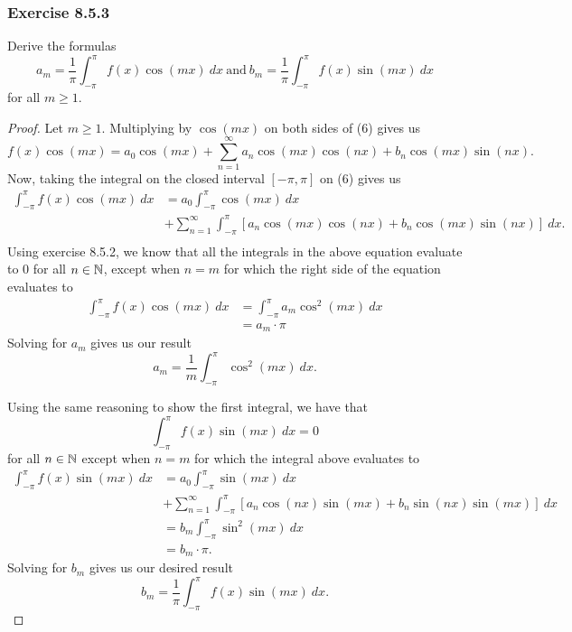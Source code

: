 \subsubsection{Exercise 8.5.3} Derive the formulas
\[  a_{m} = \frac{ 1 }{ \pi  } \int_{ -\pi  }^{ \pi  } f(x) \cos(mx) \ dx \ \text{and} \ b_{m} = \frac{ 1 }{ \pi  } \int_{ -\pi  }^{ \pi  } f(x) \sin(mx) \ dx \] for all \( m \geq 1 \).
\begin{proof}
Let \( m \geq 1  \). Multiplying by \( \cos(mx) \) on both sides of (6) gives us 
\[  f(x) \cos(mx) = a_{0} \cos(mx) + \sum_{ n=1 }^{ \infty } a_{n}\cos(mx)\cos(nx) + b_{n} \cos(mx) \sin(nx).  \]
Now, taking the integral on the closed interval \( [- \pi , \pi ] \) on (6) gives us 
\begin{align*}
    \int_{ - \pi  }^{ \pi  } f(x) \cos(mx)  \ dx &= a_{0} \int_{ -\pi  }^{ \pi  } \cos(mx)  \ dx \\ 
                                                 &+ \sum_{ n=1   }^{ \infty  } \int_{ - \pi  }^{ \pi  } [ a_{n} \cos(mx) \cos(nx) + b_{n} \cos(mx) \sin(nx)   ] \ dx. \\
\end{align*}
Using exercise 8.5.2, we know that all the integrals in the above equation evaluate to 0 for all \( n \in \mathbb{N}  \), except when \( n =m  \) for which the right side of the equation evaluates to
\begin{align*}
   \int_{ - \pi  }^{ \pi  } f(x) \cos(mx)  \ dx &= \int_{ -\pi  }^{ \pi } a_{m} \cos ^{2}(mx) \ dx \\
                                                &= a_{m} \cdot \pi
\end{align*}
Solving for \( a_{m}  \) gives us our result
\[  a_{m} = \frac{ 1 }{ m } \int_{ -\pi  }^{ \pi  } \cos ^{2}(mx) \ dx. \]

Using the same reasoning to show the first integral, we have that 
\[  \int_{ -\pi  }^{ \pi  } f(x) \sin(mx)  \ dx = 0  \]
for all \( n \in \mathbb{N}  \) except when \( n = m  \) for which the integral above evaluates to
\begin{align*}
    \int_{ -\pi  }^{ \pi  } f(x) \sin(mx)  \ dx &=  a_{0} \int_{ - \pi  }^{ \pi  } \sin(mx) \ dx \\ 
                                                &+ \sum_{ n=1 }^{ \infty  } \int_{ -\pi  }^{ \pi }   [ a_{n} \cos(nx) \sin(mx) + b_{n} \sin(nx) \sin(mx)   ] \ dx \\
                                                &= b_{m} \int_{ -\pi  }^{ \pi  } \sin^{2}(mx) \ dx \\
                                                &= b_{m} \cdot \pi.
\end{align*}
Solving for \( b_{m} \) gives us our desired result
\[  b_{m} = \frac{ 1 }{ \pi  } \int_{ - \pi  }^{ \pi  } f(x)\sin(mx) \ dx. \]

\end{proof}

